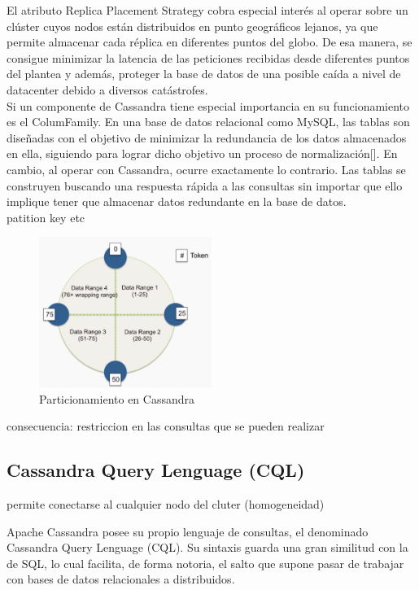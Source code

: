 El atributo Replica Placement Strategy cobra especial interés al operar sobre un clúster cuyos nodos están distribuidos en punto geográficos lejanos, ya que permite almacenar cada réplica en diferentes puntos del globo. De esa manera, se consigue minimizar la latencia de las peticiones recibidas desde diferentes puntos del plantea y además, proteger la base de datos de una posible caída a nivel de datacenter debido a diversos catástrofes.\\ 

Si un componente de Cassandra tiene especial importancia en su funcionamiento es el ColumFamily. En una base de datos relacional como MySQL, las tablas son diseñadas con el objetivo de minimizar la redundancia de los datos almacenados en ella, siguiendo para lograr dicho objetivo un proceso de normalización[]. En cambio, al operar con Cassandra, ocurre exactamente lo contrario. Las tablas se construyen buscando una respuesta rápida a las consultas sin importar que ello implique tener que almacenar datos redundante en la base de datos.\\

patition key etc



\begin{figure}[h]
	\centering
	\includegraphics[width=0.5\textwidth]{Ilustraciones/cassandra_token.png}
	\caption{Particionamiento en Cassandra}
	\label{fig:cassandra_token}
\end{figure}

consecuencia: restriccion en las consultas que se pueden realizar

\subsection{Cassandra Query Lenguage (CQL)}

permite conectarse al cualquier nodo del cluter (homogeneidad)

Apache Cassandra posee su propio lenguaje de consultas, el denominado Cassandra Query Lenguage (CQL). Su sintaxis guarda una gran similitud con la de SQL, lo cual facilita, de forma notoria, el salto que supone pasar de trabajar con bases de datos relacionales a distribuidos.\\


